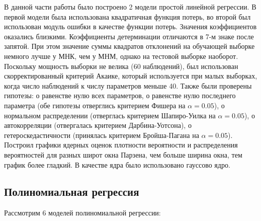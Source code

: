 \documentclass[a4paper,12pt]{article}
\begin{document}
В данной части работы было построено 2 модели простой линейной регрессии. В первой модели была использована квадратичная функция потерь, во второй был использован модуль ошибки в качестве функции потерь. Значения коэффициентов оказались близкими. Коэффициенты детерминации отличаются в 7-м знаке после запятой. При этом значение суммы квадратов отклонений на обучающей выборке немного лучше у МНК, чем у МНМ, однако на тестовой выборке наоборот. Поскольку мощность выборки не велика (60 наблюдений), был использован скорректированный критерий Акаике, который используется при малых выборках, когда число наблюдений к числу параметров меньше 40. Также были проверены гипотезы: о равенстве нулю всех параметров, о равенстве нулю последнего параметра (обе гипотезы отверглись критерием Фишера на $\alpha = 0.05$), о нормальном распределении (отверглась критерием Шапиро-Уилка на $\alpha = 0.05$), о автокорреляции (отвергалась критерием Дарбина-Уотсона), о гетероскедастичности (принялась критерием Бройша-Пагана на $\alpha = 0.05$). Построил графики ядерных оценок плотности вероятности и распределения вероятностей для разных широт окна Парзена, чем больше ширина окна, тем график более гладкий. В качестве ядра было использовано гауссово ядро.



\subsection{Полиномиальная регрессия}

Рассмотрим 6 моделей полиномиальной регрессии:
\begin{table}[H]
    \begin{center}
        \caption{Определение моделей}
    \end{center}
\end{table}
\end{document}
